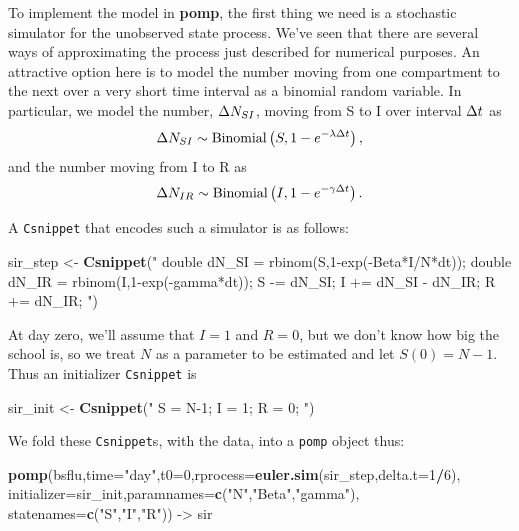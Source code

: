 \documentclass[]{article}
\newenvironment{Shaded}{\begin{snugshade}}{\end{snugshade}}
\newcommand{\KeywordTok}[1]{\textcolor[rgb]{0.13,0.29,0.53}{\textbf{#1}}}
\newcommand{\DataTypeTok}[1]{\textcolor[rgb]{0.13,0.29,0.53}{#1}}
\newcommand{\DecValTok}[1]{\textcolor[rgb]{0.00,0.00,0.81}{#1}}
\newcommand{\StringTok}[1]{\textcolor[rgb]{0.31,0.60,0.02}{#1}}
\newcommand{\OperatorTok}[1]{\textcolor[rgb]{0.81,0.36,0.00}{\textbf{#1}}}
\newcommand{\NormalTok}[1]{#1}
\begin{document}
To implement the model in \textbf{pomp}, the first thing we need is a
stochastic simulator for the unobserved state process. We've seen that
there are several ways of approximating the process just described for
numerical purposes. An attractive option here is to model the number
moving from one compartment to the next over a very short time interval
as a binomial random variable. In particular, we model the number,
\(\Delta{N_{SI}}\), moving from S to I over interval \(\Delta{t}\) as
\[\Delta{N_{SI}} \sim \mathrm{Binomial}\left(S,1-e^{-\lambda\Delta{t}}\right),\] and
the number moving from I to R as
\[\Delta{N_{IR}} \sim \mathrm{Binomial}\left(I,1-e^{-\gamma\Delta{t}}\right).\]

A \texttt{Csnippet} that encodes such a simulator is as follows:

\begin{Shaded}
\begin{Highlighting}[]
\NormalTok{sir_step <-}\StringTok{ }\KeywordTok{Csnippet}\NormalTok{(}\StringTok{"}
\StringTok{  double dN_SI = rbinom(S,1-exp(-Beta*I/N*dt));}
\StringTok{  double dN_IR = rbinom(I,1-exp(-gamma*dt));}
\StringTok{  S -= dN_SI;}
\StringTok{  I += dN_SI - dN_IR;}
\StringTok{  R += dN_IR;}
\StringTok{"}\NormalTok{)}
\end{Highlighting}
\end{Shaded}

At day zero, we'll assume that \(I=1\) and \(R=0\), but we don't know
how big the school is, so we treat \(N\) as a parameter to be estimated
and let \(S(0)=N-1\). Thus an initializer \texttt{Csnippet} is

\begin{Shaded}
\begin{Highlighting}[]
\NormalTok{sir_init <-}\StringTok{ }\KeywordTok{Csnippet}\NormalTok{(}\StringTok{"}
\StringTok{  S = N-1;}
\StringTok{  I = 1;}
\StringTok{  R = 0;}
\StringTok{"}\NormalTok{)}
\end{Highlighting}
\end{Shaded}

We fold these \texttt{Csnippet}s, with the data, into a \texttt{pomp}
object thus:

\begin{Shaded}
\begin{Highlighting}[]
\KeywordTok{pomp}\NormalTok{(bsflu,}\DataTypeTok{time=}\StringTok{"day"}\NormalTok{,}\DataTypeTok{t0=}\DecValTok{0}\NormalTok{,}\DataTypeTok{rprocess=}\KeywordTok{euler.sim}\NormalTok{(sir_step,}\DataTypeTok{delta.t=}\DecValTok{1}\OperatorTok{/}\DecValTok{6}\NormalTok{),}
     \DataTypeTok{initializer=}\NormalTok{sir_init,}\DataTypeTok{paramnames=}\KeywordTok{c}\NormalTok{(}\StringTok{"N"}\NormalTok{,}\StringTok{"Beta"}\NormalTok{,}\StringTok{"gamma"}\NormalTok{),}
     \DataTypeTok{statenames=}\KeywordTok{c}\NormalTok{(}\StringTok{"S"}\NormalTok{,}\StringTok{"I"}\NormalTok{,}\StringTok{"R"}\NormalTok{)) ->}\StringTok{ }\NormalTok{sir}
\end{Highlighting}
\end{Shaded}
\end{document}
